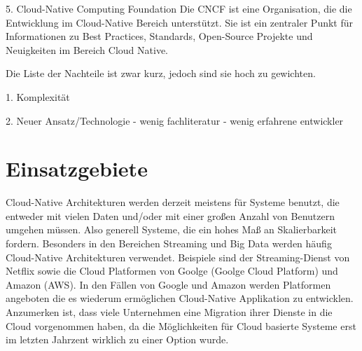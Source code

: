 5. Cloud-Native Computing Foundation
Die CNCF ist eine Organisation, die die Entwicklung im Cloud-Native Bereich unterstützt. Sie ist ein zentraler Punkt für Informationen zu Best Practices, Standards, Open-Source Projekte und Neuigkeiten im Bereich Cloud Native.

Die Liste der Nachteile ist zwar kurz, jedoch sind sie hoch zu gewichten.

1. Komplexität


2. Neuer Ansatz/Technologie
- wenig fachliteratur
- wenig erfahrene entwickler


\section{Einsatzgebiete}
Cloud-Native Architekturen werden derzeit meistens für Systeme benutzt, die entweder mit vielen Daten und/oder mit einer großen Anzahl von Benutzern umgehen müssen. Also generell Systeme, die ein hohes Maß an Skalierbarkeit fordern. Besonders in den Bereichen Streaming und Big Data werden häufig Cloud-Native Architekturen verwendet. 
Beispiele sind der Streaming-Dienst von Netflix sowie die Cloud Platformen von Goolge (Goolge Cloud Platform) und Amazon (AWS). In den Fällen von Google und Amazon werden Platformen angeboten die es wiederum ermöglichen Cloud-Native Applikation zu entwicklen.
Anzumerken ist, dass viele Unternehmen eine Migration ihrer Dienste in die Cloud vorgenommen haben, da die Möglichkeiten für Cloud basierte Systeme erst im letzten Jahrzent wirklich zu einer Option wurde. 